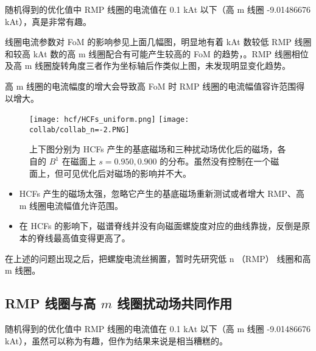   随机得到的优化值中 RMP 线圈的电流值在 0.1 kAt 以下（高 m 线圈 -9.01486676 kAt），真是非常有趣。
  
  
  
\begin{figure}[t]
\centering
{}%
{}%
{}
\end{figure}
  
  

线圈电流参数对 FoM 的影响参见上面几幅图，明显地有着 kAt 数较低 RMP 线圈和较高 kAt 数的高 m 线圈配合有可能产生较高的 FoM 的趋势，。RMP 线圈相位及高 m 线圈旋转角度三者作为坐标轴后作类似上图，未发现明显变化趋势。
  

高 m 线圈的电流幅度的增大会导致高 FoM 时 RMP 线圈的电流幅值容许范围得以增大。
  
  
\begin{figure}[htbp]
  \centering%
      \texttt{[image: hcf/HCFs\_uniform.png]}
      \texttt{[image: collab/collab\_n=-2.PNG]}
      \caption{上下图分别为 HCFs 产生的基底磁场和三种扰动场优化后的磁场，各自的 $B^1$ 在磁面上 $s=0.950,0.900$ 的分布。虽然没有控制在一个磁面上，但可见优化后对磁场的影响并不大。}
\end{figure}
  
  \begin{itemize}
    \item HCFs 产生的磁场太强，忽略它产生的基底磁场重新测试或者增大 RMP、高 m 线圈电流幅值允许范围。
    \item 在 HCFs 的影响下，磁谱脊线并没有向磁面螺旋度对应的曲线靠拢，反倒是原本的脊线最高值变得更高了。 
  \end{itemize}


在上述的问题出现之后，把螺旋电流丝搁置，暂时先研究低 n （RMP） 线圈和高 m 线圈。


\subsection{RMP 线圈与高 $m$ 线圈扰动场共同作用}
随机得到的优化值中 RMP 线圈的电流值在 0.1 kAt 以下（高 m 线圈 -9.01486676 kAt），虽然可以称为有趣，但作为结果来说是相当糟糕的。
  
